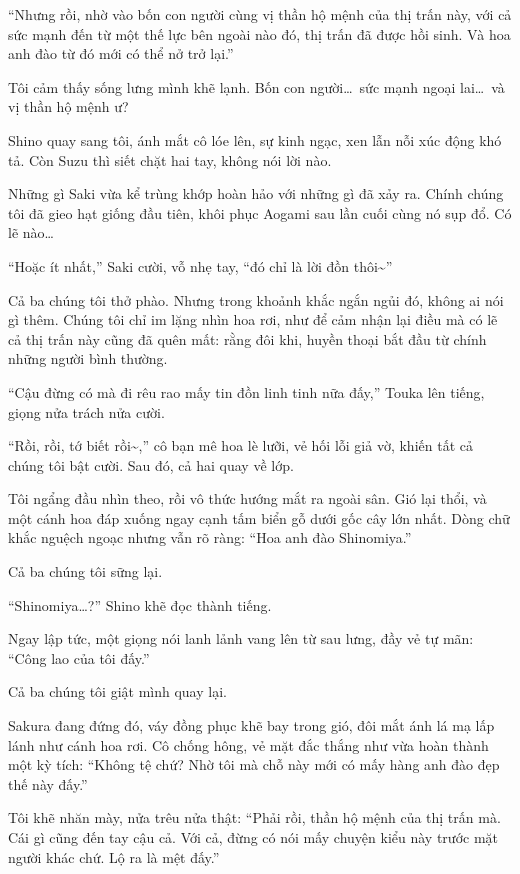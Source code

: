 \documentclass[../main.tex]{subfiles}
\begin{document}
``Nhưng rồi, nhờ vào bốn con người cùng vị thần hộ mệnh của thị trấn này, với cả sức mạnh đến từ một thế lực bên ngoài nào đó, thị trấn đã được hồi sinh. Và hoa anh đào từ đó mới có thể nở trở lại.''

Tôi cảm thấy sống lưng mình khẽ lạnh. Bốn con người\dots\ sức mạnh ngoại lai\dots\ và vị thần hộ mệnh ư?

Shino quay sang tôi, ánh mắt cô lóe lên, sự kinh ngạc, xen lẫn nỗi xúc động khó tả. Còn Suzu thì siết chặt hai tay, không nói lời nào.

Những gì Saki vừa kể trùng khớp hoàn hảo với những gì đã xảy ra. Chính chúng tôi đã gieo hạt giống đầu tiên, khôi phục Aogami sau lần cuối cùng nó sụp đổ. Có lẽ nào\dots

``Hoặc ít nhất,'' Saki cười, vỗ nhẹ tay, ``đó chỉ là lời đồn thôi\~{}''

Cả ba chúng tôi thở phào. Nhưng trong khoảnh khắc ngắn ngủi đó, không ai nói gì thêm. Chúng tôi chỉ im lặng nhìn hoa rơi, như để cảm nhận lại điều mà có lẽ cả thị trấn này cũng đã quên mất: rằng đôi khi, huyền thoại bắt đầu từ chính những người bình thường.

``Cậu đừng có mà đi rêu rao mấy tin đồn linh tinh nữa đấy,'' Touka lên tiếng, giọng nửa trách nửa cười.

``Rồi, rồi, tớ biết rồi\~{},'' cô bạn mê hoa lè lưỡi, vẻ hối lỗi giả vờ, khiến tất cả chúng tôi bật cười. Sau đó, cả hai quay về lớp.

Tôi ngẩng đầu nhìn theo, rồi vô thức hướng mắt ra ngoài sân. Gió lại thổi, và một cánh hoa đáp xuống ngay cạnh tấm biển gỗ dưới gốc cây lớn nhất. Dòng chữ khắc nguệch ngoạc nhưng vẫn rõ ràng: ``Hoa anh đào Shinomiya.''


Cả ba chúng tôi sững lại.

``Shinomiya\dots?'' Shino khẽ đọc thành tiếng.

Ngay lập tức, một giọng nói lanh lảnh vang lên từ sau lưng, đầy vẻ tự mãn: ``Công lao của tôi đấy.''

Cả ba chúng tôi giật mình quay lại.

Sakura đang đứng đó, váy đồng phục khẽ bay trong gió, đôi mắt ánh lá mạ lấp lánh như cánh hoa rơi. Cô chống hông, vẻ mặt đắc thắng như vừa hoàn thành một kỳ tích: ``Không tệ chứ? Nhờ tôi mà chỗ này mới có mấy hàng anh đào đẹp thế này đấy.''

Tôi khẽ nhăn mày, nửa trêu nửa thật: ``Phải rồi, thần hộ mệnh của thị trấn mà. Cái gì cũng đến tay cậu cả. Với cả, đừng có nói mấy chuyện kiểu này trước mặt người khác chứ. Lộ ra là mệt đấy.''
\end{document}
